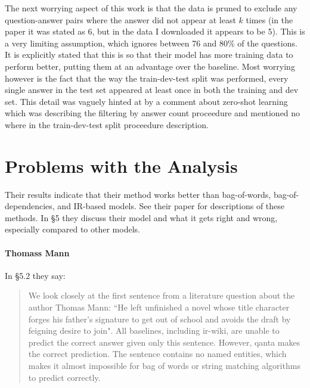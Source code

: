 \documentclass[12pt]{article}
\begin{document}

The next worrying aspect of this work is that the data is pruned to
exclude any question-answer pairs where the answer did not appear at
least $k$ times (in the paper it was stated as 6, but in the data
I downloaded it appears to be 5).
This is a very limiting assumption, which ignores between 76 and 80\%
of the questions. It is explicitly stated that this is so that their model
has more training data to perform better, putting them at an advantage over
the baseline.
Most worrying however is the fact that the way the train-dev-test split
was performed, every single answer in the test set appeared at least once
in both the training and dev set.
This detail was vaguely hinted at by a comment about zero-shot learning
which was describing the filtering by answer count proceedure
and mentioned no where in the train-dev-test split proceedure description.


\section{Problems with the Analysis}
Their results indicate that their method works better than
bag-of-words, bag-of-dependencies, and IR-based models.
See their paper for descriptions of these methods.
In \S5 they discuss their model and what it gets right and
wrong, especially compared to other models.

\paragraph{Thomass Mann}
In \S5.2 they say:
\begin{quote}
We look closely at the first sentence from a
literature question about the author Thomas
Mann: ``He left unfinished a novel whose title
character forges his father’s signature to get
out of school and avoids the draft by feigning
desire to join".
All baselines, including ir-wiki, are unable
to predict the correct answer given only this
sentence. However, qanta makes the correct
prediction. The sentence contains no named
entities, which makes it almost impossible for
bag of words or string matching algorithms to
predict correctly.
\end{quote}
\end{document}
